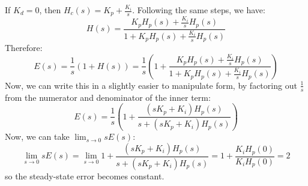 \documentclass[10pt]{article}
\begin{document}
\begin{enumerate}[label=\alph*)]
			\begin{solution}
				If \( K_d = 0 \), then \( H_c(s) = K_p + \frac{K_i}{s} \). Following the same steps, we have:
				\[
					H(s) = \frac{K_p H_p(s) + \frac{K_i}{s} H_p(s)}{1 + K_p H_p(s) +\frac{K_i}{s}H_p(s)}
				\]
				Therefore:
				\[
				E(s) = \frac{1}{s}(1 + H(s)) = \frac{1}{s}\left(1 + \frac{K_p H_p(s) + \frac{K_i}{s} H_p(s)}{1 + K_p H_p(s) +\frac{K_i}{s}H_p(s)}\right)
				\] 
				Now, we can write this in a slightly easier to manipulate form, by factoring out \( \frac{1}{s} \) 
				from the numerator and denominator of the inner term:
				\[
				E(s) = \frac{1}{s}\left( 1 + \frac{(s K_p + K_i)H_p(s)}{s + (sK_p + K_i) H_p(s)} \right) 
				\] 
				Now, we can take \( \lim_{s \to 0}s E(s) \):
				\[
					\lim_{s \to 0} sE(s) = \lim_{s \to 0} 1 + \frac{(s K_p + K_i)H_p(s)}{s + (sK_p + K_i) H_p(s)} 
					=1 +  \frac{K_i H_p(0)}{K_i H_p(0)} = 2
				\] 
				so the steady-state error becomes constant. 
			\end{solution}
	\end{enumerate}
\end{document}
